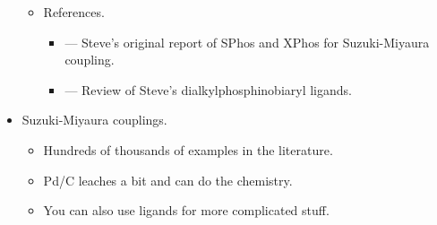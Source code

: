 \documentclass[../notes.tex]{subfiles}
\begin{document}
\begin{itemize}
\begin{itemize}
        \item References.
        \begin{itemize}
            \item \textcite{bib:BuchwaldRep} --- Steve's original report of SPhos and XPhos for Suzuki-Miyaura coupling.
            \item \textcite{bib:BuchwaldRev} --- Review of Steve's dialkylphosphinobiaryl ligands.
        \end{itemize}
    \end{itemize}
    \item Suzuki-Miyaura couplings.
    \begin{itemize}
        \item Hundreds of thousands of examples in the literature.
        \item Pd/C leaches a bit and can do the chemistry.
        \item You can also use ligands for more complicated stuff.
    \end{itemize}
\end{itemize}
\end{document}
